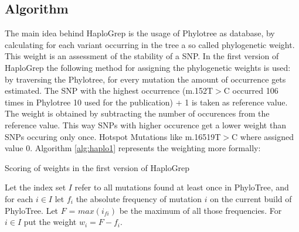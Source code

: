 \subsection{Algorithm}\label{hg:algorithm}
The main idea behind HaploGrep is the usage of Phylotree as database, by calculating for each variant occurring in the tree a so called phylogenetic weight. This weight is an assessment of the stability of a SNP. In the first version of HaploGrep the following method for assigning the phylogenetic weights is used: by traversing the Phylotree, for every mutation the amount of occurrence gets estimated. The SNP with the highest occurrence (m.152T$>$C occurred 106 times in Phylotree 10 used for the publication) + 1 is taken as reference value. The weight is obtained by subtracting the number of occurences from the reference value. This way SNPs with higher occurence get a lower weight than SNPs occuring only once. Hotspot Mutations like m.16519T$>$C where assigned value 0. Algorithm \ref{alg:haplo1} represents the weighting more formally:

\begin{algorithm}
\caption{Scoring of weights in the first version of HaploGrep}
\label{alg:haplo1}
Let the index set $I$ refer to all mutations found at least once in PhyloTree, and for each $i \in I$ let $f_i$ the absolute frequency of mutation $i$ on the current build of PhyloTree. Let $F$ = $max(i_{fi})$ be the maximum of all those frequencies. For $i \in I$ put the weight $w_i = F-f_i$. 
\end{algorithm}

